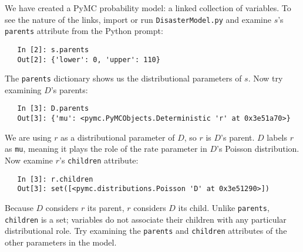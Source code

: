 We have created a PyMC probability model: a linked collection of variables. To see the nature of the links, import or run \texttt{DisasterModel.py} and examine $s$'s \texttt{parents} attribute from the Python prompt:
\begin{verbatim}
   In [2]: s.parents
   Out[2]: {'lower': 0, 'upper': 110}
\end{verbatim}
The \texttt{parents} dictionary shows us the distributional parameters of $s$. Now try examining $D$'s parents:
\begin{verbatim}
   In [3]: D.parents
   Out[3]: {'mu': <pymc.PyMCObjects.Deterministic 'r' at 0x3e51a70>}
\end{verbatim}
We are using $r$ as a distributional parameter of $D$, so $r$ is $D$'s parent. $D$ labels $r$ as \texttt{mu}, meaning it plays the role of the rate parameter in $D$'s Poisson distribution. Now examine $r$'s \texttt{children} attribute:
\begin{verbatim}
   In [3]: r.children
   Out[3]: set([<pymc.distributions.Poisson 'D' at 0x3e51290>])
\end{verbatim}
Because $D$ considers $r$ its parent, $r$ considers $D$ its child. Unlike \texttt{parents}, \texttt{children} is a set; variables do not associate their children with any particular distributional role. Try examining the \texttt{parents} and \texttt{children} attributes of the other parameters in the model.

